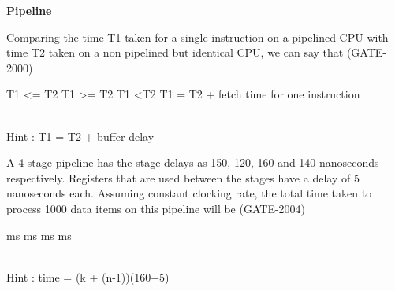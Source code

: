 
\centerline{\textbf{ \LARGE Pipeline }}

\begin{questyle}
  \question  Comparing the time T1 taken for a single instruction on a pipelined CPU with time
            T2 taken on a non­ pipelined but identical CPU, we can say that  (GATE-2000)

  \begin{oneparchoices}
    \choice         T1 \textless= T2
    \CorrectChoice  T1 \textgreater= T2
    \choice         T1 \textless T2
    \choice         T1 = T2 + fetch time for one instruction
  \end{oneparchoices}
  \\ Hint : T1 = T2 + buffer delay
\end{questyle}


\begin{questyle}
  \question  A 4-stage pipeline has the stage delays as 150, 120, 160 and 140 nanoseconds respectively.
            Registers that are used between the stages have a delay of 5 nanoseconds each. Assuming
            constant clocking rate, the total time taken to process 1000 data items on this pipeline will be  (GATE-2004)

  \begin{oneparchoices}
     ms
     ms
     ms
     ms
  \end{oneparchoices}
  \\ Hint : time = (k + (n-1))(160+5)
\end{questyle}


